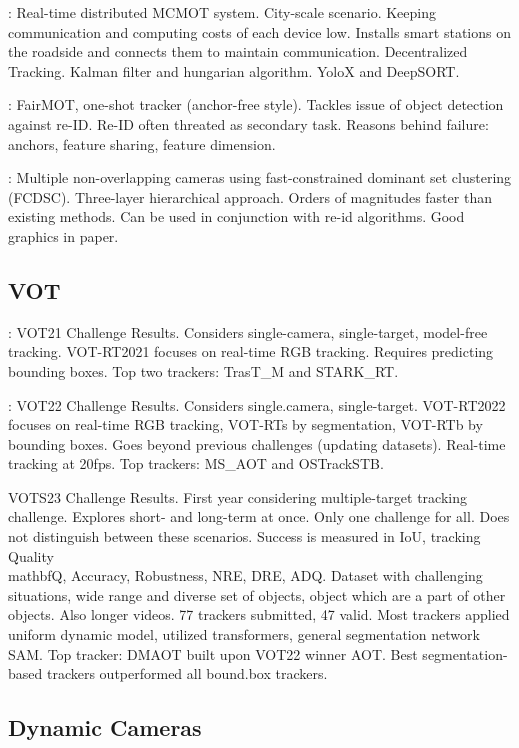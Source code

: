 \cite{Chen22}: Real-time distributed MCMOT system. City-scale scenario. Keeping communication and computing costs of each device low. Installs smart stations on the roadside and connects them to maintain communication. Decentralized Tracking. Kalman filter and hungarian algorithm. YoloX and DeepSORT.

\cite{Zhang21}: FairMOT, one-shot tracker (anchor-free style). Tackles issue of object detection against re-ID. Re-ID often threated as secondary task. Reasons behind failure: anchors, feature sharing, feature dimension.

\cite{Tesfaye19}: Multiple non-overlapping cameras using fast-constrained dominant set clustering (FCDSC). Three-layer hierarchical approach. Orders of magnitudes faster than existing methods. Can be used in conjunction with re-id algorithms. Good graphics in paper.

\subsection{VOT}

\cite{Kristan21}: VOT21 Challenge Results. Considers single-camera, single-target, model-free tracking. VOT-RT2021 focuses on real-time RGB tracking. Requires predicting bounding boxes. Top two trackers: TrasT\_M and STARK\_RT.

\cite{Kristan22}: VOT22 Challenge Results. Considers single.camera, single-target. VOT-RT2022 focuses on real-time RGB tracking, VOT-RTs by segmentation, VOT-RTb by bounding boxes. Goes beyond previous challenges (updating datasets). Real-time tracking at 20fps. Top trackers: MS\_AOT and OSTrackSTB.

\cite{Kristan23} VOTS23 Challenge Results. First year considering multiple-target tracking challenge. Explores short- and long-term at once. Only one challenge for all. Does not distinguish between these scenarios. Success is measured in IoU, tracking Quality \\mathbf{Q}, Accuracy, Robustness, NRE, DRE, ADQ. Dataset with challenging situations, wide range and diverse set of objects, object which are a part of other objects.  Also longer videos. 77 trackers submitted, 47 valid. Most trackers applied uniform dynamic model, utilized transformers, general segmentation network SAM. Top tracker: DMAOT built upon VOT22 winner AOT. Best segmentation-based trackers outperformed all bound.box trackers.

\subsection{Dynamic Cameras}

